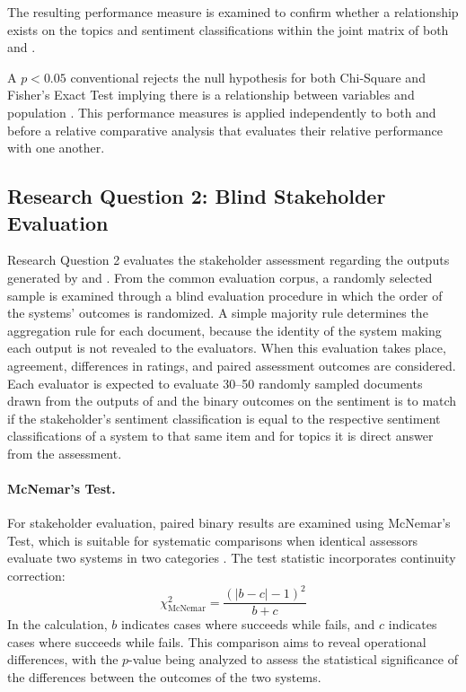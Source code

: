 The resulting performance measure is examined to confirm whether a relationship exists on the topics and sentiment classifications within the joint matrix of both \sysA{} and \sysB{}.

A $p < 0.05$ conventional rejects the null hypothesis for both Chi-Square and Fisher's Exact Test implying there is a relationship between variables and population \parencite{mays2026use}. This performance measures is applied
independently to both \sysA{} and \sysB{} before a relative comparative
analysis that evaluates their relative performance with one another.


\subsection*{Research Question 2: Blind Stakeholder Evaluation}

Research Question 2 evaluates the stakeholder assessment regarding the outputs
generated by \sysA{} and \sysB. From the common evaluation corpus, a randomly
selected sample is examined through a blind evaluation procedure in which
the order of the systems' outcomes is randomized. A simple majority rule determines the aggregation rule for each document, because the identity of
the system making each output is not revealed to the evaluators. When this
evaluation takes place, agreement, differences in ratings, and paired
assessment outcomes are considered. Each evaluator is expected to evaluate
30--50 randomly sampled documents drawn from the outputs of \sysA{} and
\sysB the binary outcomes on the sentiment is to match if the stakeholder's sentiment classification is equal to the respective sentiment classifications of a system to that same item and for topics it is direct answer from the assessment.

\paragraph{McNemar's Test.} For stakeholder evaluation, paired binary results
are examined using McNemar's Test, which is suitable for systematic
comparisons when identical assessors evaluate two systems in two categories \parencite{mcp2025}.
The test statistic incorporates continuity correction:
\begin{equation}
	\chi^2_{\text{McNemar}} = \frac{\left(\lvert b - c \rvert - 1\right)^2}{b + c}
	\label{eq:mcnemar}
\end{equation}
In the calculation, $b$ indicates cases where \sysA{} succeeds while \sysB{}
fails, and $c$ indicates cases where \sysB{} succeeds while \sysA{} fails. This
comparison aims to reveal operational differences, with the $p$-value being
analyzed to assess the statistical significance of the differences between the
outcomes of the two systems.

